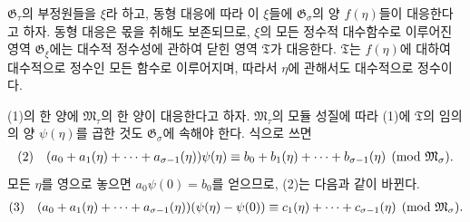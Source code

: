 $\mathfrak G_\tau$의 부정원들을 $\xi$라 하고, 동형 대응에 따라 이 $\xi$들에 $\mathfrak G_\sigma$의 양 $f(\eta)$들이 대응한다고 하자. 동형 대응은 몫을 취해도 보존되므로, $\xi$의 모든 정수적 대수함수로 이루어진 영역 $\mathfrak G_\xi$에는 대수적 정수성에 관하여 닫힌 영역 $\mathfrak T$가 대응한다. $\mathfrak T$는 $f(\eta)$에 대하여 대수적으로 정수인 모든 함수로 이루어지며, 따라서 $\eta$에 관해서도 대수적으로 정수이다.

(1)의 한 양에 $\mathfrak M_\tau$의 한 양이 대응한다고 하자. $\mathfrak M_\tau$의 모듈 성질에 따라 (1)에 $\mathfrak T$의 임의의 양 $\psi(\eta)$를 곱한 것도 $\mathfrak G_\sigma$에 속해야 한다. 식으로 쓰면
\[
\begin{array}{@{}l@{\quad}l@{}}
(2)& \displaystyle (a_0+a_1(\eta)+\cdots+a_{\sigma-1}(\eta))\psi(\eta)
\equiv b_0+b_1(\eta)+\cdots+b_{\sigma-1}(\eta)
\pmod{\mathfrak M_\sigma}.
\end{array}
\]
모든 $\eta$를 영으로 놓으면 $a_0\psi(0)=b_0$를 얻으므로, (2)는 다음과 같이 바뀐다.
\[
\begin{array}{@{}l@{\quad}l@{}}
(3)& \displaystyle (a_0+a_1(\eta)+\cdots+a_{\sigma-1}(\eta))(\psi(\eta)-\psi(0))
\equiv c_1(\eta)+\cdots+c_{\sigma-1}(\eta)
\pmod{\mathfrak M_\sigma}.
\end{array}
\]

